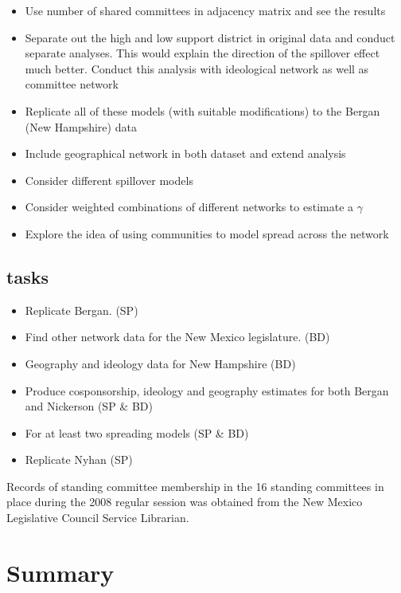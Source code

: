 \documentclass[12pt]{article}
\begin{document}
\begin{itemize}
\color{red}
\item Use number of shared committees in adjacency matrix and see the results

\item Separate out the high and low support district in original data and conduct separate analyses. This would explain the direction of the spillover effect much better. Conduct this analysis with ideological network as well as committee network

\item Replicate all of these models (with suitable modifications) to the Bergan (New Hampshire) data

\item Include geographical network in both dataset and extend analysis

\item Consider different spillover models

\item Consider weighted combinations of different networks to estimate a $\gamma$

\item Explore the idea of using communities to model spread across the network

\end{itemize}




\subsection{tasks}
\begin{itemize}
\item Replicate Bergan. (SP)
\item Find other network data for the New Mexico legislature. (BD)
\item Geography and ideology data for New Hampshire (BD)
\item Produce cosponsorship, ideology and geography estimates for both Bergan and Nickerson (SP \& BD)
\item For at least two spreading models (SP \& BD)
\item Replicate Nyhan (SP)
\end{itemize}


Records of standing committee membership in the 16 standing committees in place during the 2008 regular session was obtained from the New Mexico Legislative Council Service Librarian. 

\section{Summary}
\end{document}
